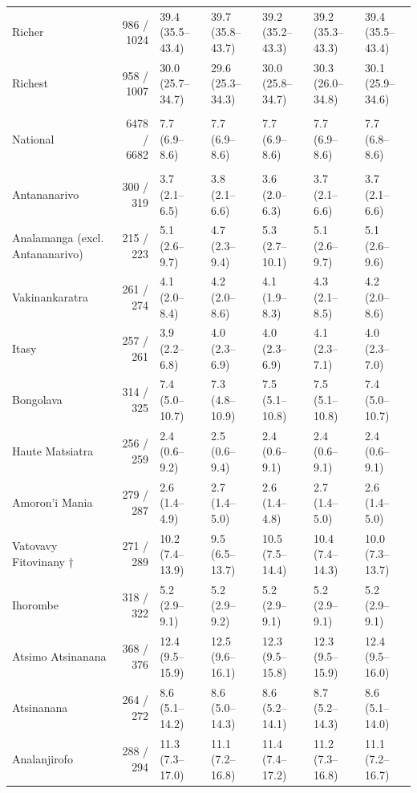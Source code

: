 \begin{longtable}{l|rlllll}
Richer & 986 / 1024 & 39.4 (35.5–43.4) & 39.7 (35.8–43.7) & 39.2 (35.2–43.3) & 39.2 (35.3–43.3) & 39.4 (35.5–43.4) \\ 
Richest & 958 / 1007 & 30.0 (25.7–34.7) & 29.6 (25.3–34.3) & 30.0 (25.8–34.7) & 30.3 (26.0–34.8) & 30.1 (25.9–34.6) \\ 
\midrule\addlinespace[2.5pt]
\multicolumn{7}{l}{Wasting — National} \\[2.5pt] 
\midrule\addlinespace[2.5pt]
National & 6478 / 6682 & 7.7 (6.9–8.6) & 7.7 (6.9–8.6) & 7.7 (6.9–8.6) & 7.7 (6.9–8.6) & 7.7 (6.8–8.6) \\ 
\midrule\addlinespace[2.5pt]
\multicolumn{7}{l}{Wasting — Region} \\[2.5pt] 
\midrule\addlinespace[2.5pt]
Antananarivo & 300 / 319 & 3.7 (2.1–6.5) & 3.8 (2.1–6.6) & 3.6 (2.0–6.3) & 3.7 (2.1–6.6) & 3.7 (2.1–6.6) \\ 
Analamanga (excl. Antananarivo) & 215 / 223 & 5.1 (2.6–9.7) & 4.7 (2.3–9.4) & 5.3 (2.7–10.1) & 5.1 (2.6–9.7) & 5.1 (2.6–9.6) \\ 
Vakinankaratra & 261 / 274 & 4.1 (2.0–8.4) & 4.2 (2.0–8.6) & 4.1 (1.9–8.3) & 4.3 (2.1–8.5) & 4.2 (2.0–8.6) \\ 
Itasy & 257 / 261 & 3.9 (2.2–6.8) & 4.0 (2.3–6.9) & 4.0 (2.3–6.9) & 4.1 (2.3–7.1) & 4.0 (2.3–7.0) \\ 
Bongolava & 314 / 325 & 7.4 (5.0–10.7) & 7.3 (4.8–10.9) & 7.5 (5.1–10.8) & 7.5 (5.1–10.8) & 7.4 (5.0–10.7) \\ 
Haute Matsiatra & 256 / 259 & 2.4 (0.6–9.2) & 2.5 (0.6–9.4) & 2.4 (0.6–9.1) & 2.4 (0.6–9.1) & 2.4 (0.6–9.1) \\ 
Amoron'i Mania & 279 / 287 & 2.6 (1.4–4.9) & 2.7 (1.4–5.0) & 2.6 (1.4–4.8) & 2.7 (1.4–5.0) & 2.6 (1.4–5.0) \\ 
Vatovavy Fitovinany † & 271 / 289 & 10.2 (7.4–13.9) & 9.5 (6.5–13.7) & 10.5 (7.5–14.4) & 10.4 (7.4–14.3) & 10.0 (7.3–13.7) \\ 
Ihorombe & 318 / 322 & 5.2 (2.9–9.1) & 5.2 (2.9–9.2) & 5.2 (2.9–9.1) & 5.2 (2.9–9.1) & 5.2 (2.9–9.1) \\ 
Atsimo Atsinanana & 368 / 376 & 12.4 (9.5–15.9) & 12.5 (9.6–16.1) & 12.3 (9.5–15.8) & 12.3 (9.5–15.9) & 12.4 (9.5–16.0) \\ 
Atsinanana & 264 / 272 & 8.6 (5.1–14.2) & 8.6 (5.0–14.3) & 8.6 (5.2–14.1) & 8.7 (5.2–14.3) & 8.6 (5.1–14.0) \\ 
Analanjirofo & 288 / 294 & 11.3 (7.3–17.0) & 11.1 (7.2–16.8) & 11.4 (7.4–17.2) & 11.2 (7.3–16.8) & 11.1 (7.2–16.7) \\ 

\end{longtable}
